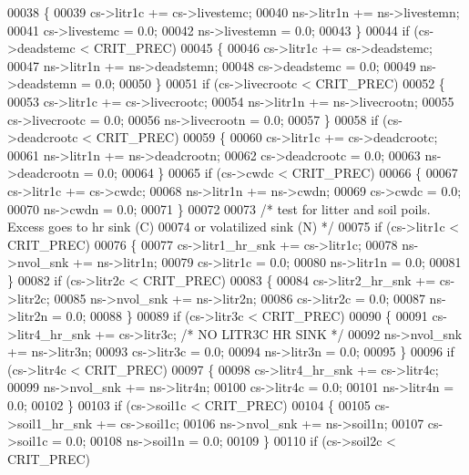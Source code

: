 \begin{DoxyCode}
00038     \{
00039         cs->litr1c += cs->livestemc;
00040         ns->litr1n += ns->livestemn;
00041         cs->livestemc = 0.0;
00042         ns->livestemn = 0.0;
00043     \}
00044     \textcolor{keywordflow}{if} (cs->deadstemc < CRIT\_PREC)
00045     \{
00046         cs->litr1c += cs->deadstemc;
00047         ns->litr1n += ns->deadstemn;
00048         cs->deadstemc = 0.0;
00049         ns->deadstemn = 0.0;
00050     \}
00051     \textcolor{keywordflow}{if} (cs->livecrootc < CRIT\_PREC)
00052     \{
00053         cs->litr1c += cs->livecrootc;
00054         ns->litr1n += ns->livecrootn;
00055         cs->livecrootc = 0.0;
00056         ns->livecrootn = 0.0;
00057     \}
00058     \textcolor{keywordflow}{if} (cs->deadcrootc < CRIT\_PREC)
00059     \{
00060         cs->litr1c += cs->deadcrootc;
00061         ns->litr1n += ns->deadcrootn;
00062         cs->deadcrootc = 0.0;
00063         ns->deadcrootn = 0.0;
00064     \}
00065     \textcolor{keywordflow}{if} (cs->cwdc < CRIT\_PREC)
00066     \{
00067         cs->litr1c += cs->cwdc;
00068         ns->litr1n += ns->cwdn;
00069         cs->cwdc = 0.0;
00070         ns->cwdn = 0.0;
00071     \}
00072     
00073     \textcolor{comment}{/* test for litter and soil poils. Excess goes to hr sink (C)}
00074 \textcolor{comment}{    or volatilized sink (N) */}
00075     \textcolor{keywordflow}{if} (cs->litr1c < CRIT\_PREC)
00076     \{
00077         cs->litr1\_hr\_snk += cs->litr1c;
00078         ns->nvol\_snk += ns->litr1n;
00079         cs->litr1c = 0.0;
00080         ns->litr1n = 0.0;
00081     \}
00082     \textcolor{keywordflow}{if} (cs->litr2c < CRIT\_PREC)
00083     \{
00084         cs->litr2\_hr\_snk += cs->litr2c;
00085         ns->nvol\_snk += ns->litr2n;
00086         cs->litr2c = 0.0;
00087         ns->litr2n = 0.0;
00088     \}
00089     \textcolor{keywordflow}{if} (cs->litr3c < CRIT\_PREC)
00090     \{
00091         cs->litr4\_hr\_snk += cs->litr3c; \textcolor{comment}{/* NO LITR3C HR SINK */}
00092         ns->nvol\_snk += ns->litr3n;
00093         cs->litr3c = 0.0;
00094         ns->litr3n = 0.0;
00095     \}
00096     \textcolor{keywordflow}{if} (cs->litr4c < CRIT\_PREC)
00097     \{
00098         cs->litr4\_hr\_snk += cs->litr4c;
00099         ns->nvol\_snk += ns->litr4n;
00100         cs->litr4c = 0.0;
00101         ns->litr4n = 0.0;
00102     \}
00103     \textcolor{keywordflow}{if} (cs->soil1c < CRIT\_PREC)
00104     \{
00105         cs->soil1\_hr\_snk += cs->soil1c;
00106         ns->nvol\_snk += ns->soil1n;
00107         cs->soil1c = 0.0;
00108         ns->soil1n = 0.0;
00109     \}
00110     \textcolor{keywordflow}{if} (cs->soil2c < CRIT\_PREC)

\end{DoxyCode}
